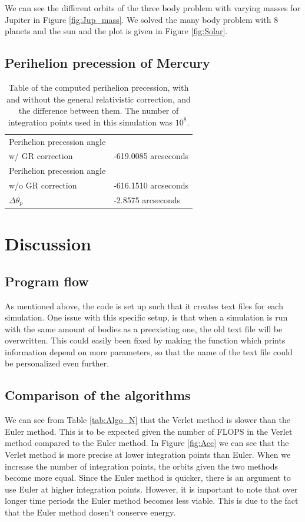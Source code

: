 \documentclass{article}
\begin{document}
\begin{multicols}{2}
We can see the different orbits of the three body problem with varying masses for Jupiter in Figure \ref{fig:Jup_mass}. We solved the many body problem with 8 planets and the sun and the plot is given in Figure \ref{fig:Solar}. 

\subsection{Perihelion precession of Mercury}
\begin{table}[H]
	\caption{Table of the computed perihelion precession, with and without the general relativistic correction, and the difference between them. The number of integration points used in this simulation was $10^8$.}
	\label{table:peri}
	\begin{tabular}{l|l}
		\hline
		Perihelion precession angle \\ w/  GR correction  & -619.0085 arcseconds \\ \hline
		Perihelion precession angle \\ w/o GR correction & -616.1510 arcseconds   \\ \hline
		$\Delta \theta_p$& -2.8575 arcseconds   \\ \hline
	\end{tabular}
\end{table}

\section{Discussion}

\subsection{Program flow}
As mentioned above, the code is set up such that it creates text files for each simulation. One issue with this specific setup, is that when a simulation is run with the same amount of bodies as a preexisting one, the old text file will be overwritten. This could easily been fixed by making the function which prints information depend on more parameters, so that the name of the text file could be personalized even further. 

\subsection{Comparison of the algorithms}

We can see from Table \ref{tab:Algo_N} that the Verlet method is slower than the Euler method. This is to be expected given the number of FLOPS in the Verlet method compared to the Euler method. In Figure \ref{fig:Acc} we can see that the Verlet method is more precise at lower integration points than Euler. When we increase the number of integration points, the orbits given the two methods become more equal. Since the Euler method is quicker, there is an argument to use Euler at higher integration points. However, it is important to note that over longer time periods the Euler method becomes less viable. This is due to the fact that the Euler method dosen't conserve energy. 


\end{multicols}
\end{document}
